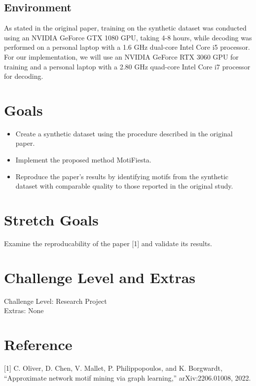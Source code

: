 \documentclass{article}
\begin{document}
\subsection{Environment}
As stated in the original paper, training on the synthetic dataset was conducted using an NVIDIA GeForce GTX 1080 GPU, taking 4-8 hours, while decoding was performed on a personal laptop with a 1.6 GHz dual-core Intel Core i5 processor. For our implementation, we will use an NVIDIA GeForce RTX 3060 GPU for training and a personal laptop with a 2.80 GHz quad-core Intel Core i7 processor for decoding.


\section{Goals}
\begin{itemize}
    \item Create a synthetic dataset using the procedure described in the original paper.
    \item Implement the proposed method MotiFiesta.
    \item Reproduce the paper's results by identifying motifs from the synthetic dataset with comparable quality to those reported in the original study.
\end{itemize}

\section{Stretch Goals}
Examine the reproducability of the paper [1] and validate its results.
\section{Challenge Level and Extras}
Challenge Level: Research Project \\
Extras: None

\section{Reference}
[1] C. Oliver, D. Chen, V. Mallet, P. Philippopoulos, and K. Borgwardt, “Approximate network motif mining via graph learning,” arXiv:2206.01008, 2022.
\end{document}
